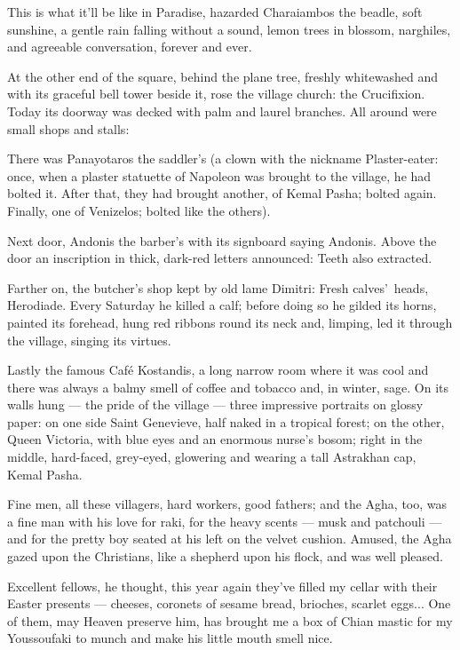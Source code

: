 \documentclass[diploma]{softlab-thesis}
\begin{document}
This is what it’ll be like in Paradise, hazarded Charaiambos the beadle,
soft sunshine, a gentle rain falling without a sound, lemon trees in
blossom, narghiles, and agreeable conversation, forever and ever.

At the other end of the square, behind the plane tree, freshly whitewashed
and with its graceful bell tower beside it, rose the village church: the
Crucifixion. Today its doorway was decked with palm and laurel branches. All
around were small shops and stalls:

There was Panayotaros the saddler’s (a clown with the nickname
Plaster-eater: once, when a plaster statuette of Napoleon was brought to the
village, he had bolted it. After that, they had brought another, of Kemal
Pasha; bolted again. Finally, one of Venizelos; bolted like the others).

Next door, Andonis the barber’s with its signboard saying Andonis. Above the
door an inscription in thick, dark-red letters announced: Teeth also
extracted.

Farther on, the butcher’s shop kept by old lame Dimitri: Fresh
calves’~heads, Herodiade. Every Saturday he killed a calf; before doing so
he gilded its horns, painted its forehead, hung red ribbons round its neck
and, limping, led it through the village, singing its virtues.

Lastly the famous Café Kostandis, a long narrow room where it was cool and
there was always a balmy smell of coffee and tobacco and, in winter,
sage. On its walls hung --- the pride of the village --- three impressive
portraits on glossy paper: on one side Saint Genevieve, half naked in a
tropical forest; on the other, Queen Victoria, with blue eyes and an
enormous nurse’s bosom; right in the middle, hard-faced, grey-eyed,
glowering and wearing a tall Astrakhan cap, Kemal Pasha.

Fine men, all these villagers, hard workers, good fathers; and the Agha,
too, was a fine man with his love for raki, for the heavy scents --- musk
and patchouli --- and for the pretty boy seated at his left on the velvet
cushion. Amused, the Agha gazed upon the Christians, like a shepherd upon
his flock, and was well pleased.

Excellent fellows, he thought, this year again they’ve filled my cellar with
their Easter presents --- cheeses, coronets of sesame bread, brioches,
scarlet eggs... One of them, may Heaven preserve him, has brought me a box
of Chian mastic for my Youssoufaki to munch and make his little mouth smell
nice.
\end{document}
